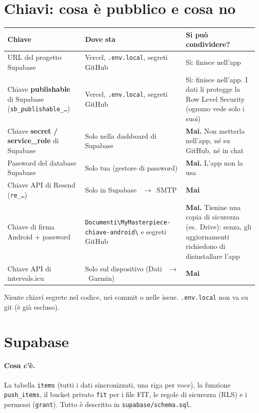 \documentclass[11pt,a4paper]{article}
\newcommand{\thead}[1]{\textbf{\color{accent}#1}}
\newcommand{\ra}{\unskip\nobreak\ $\rightarrow$\ \ignorespaces}            %
\newcommand{\bt}[1]{\textbf{#1}}               %
\newcommand{\code}[1]{\texttt{#1}}             %
\begin{document}
\section{Chiavi: cosa è pubblico e cosa no}\label{sec:chiavi}

\begin{tabularx}{\textwidth}{L{4.4cm}L{4.4cm}Y}
  \toprule \thead{Chiave} & \thead{Dove sta} & \thead{Si può condividere?} \\ \midrule
  URL del progetto Supabase & Vercel, \code{.env.local}, segreti GitHub & Sì: finisce nell'app \\
  Chiave \bt{publishable} di Supabase (\code{sb\_publishable\_\dots}) &
    Vercel, \code{.env.local}, segreti GitHub &
    Sì: finisce nell'app. I dati li protegge la Row Level Security (ognuno vede solo i suoi) \\
  Chiave \bt{secret / service\_role} di Supabase & Solo nella dashboard di Supabase &
    \textcolor{accent}{\bt{Mai.}} Non metterla nell'app, né su GitHub, né in chat \\
  Password del database Supabase & Solo tua (gestore di password) &
    \textcolor{accent}{\bt{Mai.}} L'app non la usa \\
  Chiave API di Resend (\code{re\_\dots}) & Solo in Supabase \ra SMTP & \textcolor{accent}{\bt{Mai}} \\
  Chiave di firma Android + password &
    \code{Documenti\textbackslash\allowbreak MyMasterpiece-\allowbreak chiave-android\textbackslash} e segreti GitHub &
    \textcolor{accent}{\bt{Mai.}} Tienine una copia di sicurezza (es.\ Drive): senza, gli
    aggiornamenti richiedono di disinstallare l'app \\
  Chiave API di intervals.icu & Solo sul dispositivo (Dati \ra Garmin) & \textcolor{accent}{\bt{Mai}} \\
\bottomrule
\end{tabularx}

\begin{attenzione}
Niente chiavi segrete nel codice, nei commit o nelle issue. \code{.env.local} non va su git (è già escluso).
\end{attenzione}

\section{Supabase}\label{sec:supabase}

\paragraph{Cosa c'è.} La tabella \code{items} (tutti i dati sincronizzati, una riga per voce), la
funzione \code{push\_items}, il bucket privato \code{fit} per i file FIT, le regole di sicurezza
(RLS) e i permessi (\code{grant}). Tutto è descritto in \code{supabase/schema.sql}.
\end{document}
